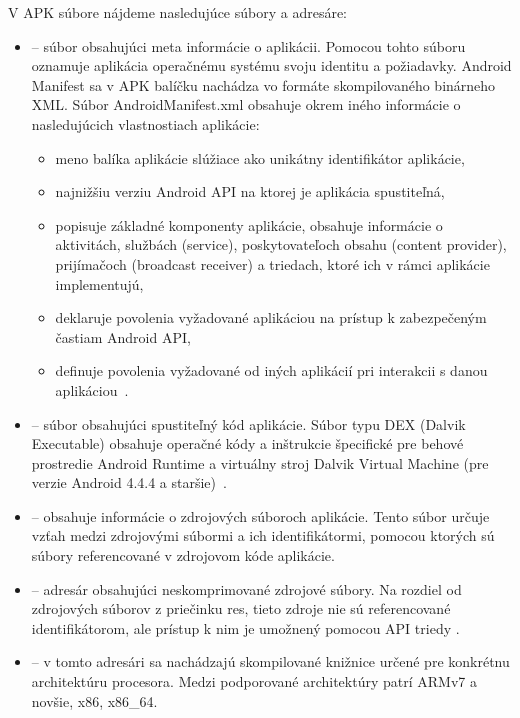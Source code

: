 V APK súbore nájdeme nasledujúce súbory a adresáre:
\begin{itemize}

	\item {} -- súbor obsahujúci meta informácie o aplikácii. Pomocou tohto súboru oznamuje aplikácia operačnému systému svoju identitu a požiadavky. Android Manifest sa v APK balíčku nachádza vo formáte skompilovaného binárneho XML.
Súbor AndroidManifest.xml obsahuje okrem iného informácie o nasledujúcich vlastnostiach aplikácie:
		
		\begin{itemize}
			\item meno balíka aplikácie slúžiace ako unikátny identifikátor aplikácie,
			\item najnižšiu verziu Android API na ktorej je aplikácia spustiteľná,
			\item popisuje základné komponenty aplikácie, obsahuje informácie o aktivitách, službách (service), poskytovateľoch obsahu (content provider), prijímačoch (broadcast receiver) a triedach, ktoré ich v rámci aplikácie implementujú,
			\item deklaruje povolenia vyžadované aplikáciou na prístup k zabezpečeným častiam Android API,
			\item definuje povolenia vyžadované od iných aplikácií pri interakcii s danou aplikáciou~\cite{Manifest}.
		\end{itemize}
	
	\item {} -- súbor obsahujúci spustiteľný kód aplikácie. Súbor typu DEX (Dalvik Executable) obsahuje operačné kódy a inštrukcie špecifické pre behové prostredie Android Runtime a virtuálny stroj Dalvik Virtual Machine (pre verzie Android 4.4.4 a staršie)~\cite{DexFormat}. 

	\item {} -- obsahuje informácie o zdrojových súboroch aplikácie. Tento súbor určuje vzťah medzi zdrojovými súbormi a ich identifikátormi, pomocou ktorých sú súbory referencované v zdrojovom kóde aplikácie.
	
	\item {} -- adresár obsahujúci neskomprimované zdrojové súbory.  Na rozdiel od zdrojových súborov z priečinku res, tieto zdroje nie sú referencované identifikátorom, ale prístup k nim je umožnený pomocou API triedy .
	
	\item {} -- v tomto adresári sa nachádzajú skompilované knižnice určené pre konkrétnu architektúru procesora. Medzi podporované architektúry patrí ARMv7 a novšie, x86, x86\_64.


\end{itemize}
